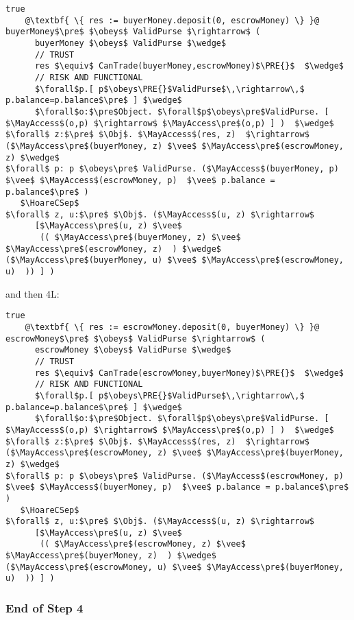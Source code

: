 \begin{lstlisting}[escapechar=@]
true
    @\textbf{ \{ res := buyerMoney.deposit(0, escrowMoney) \} }@
buyerMoney$\pre$ $\obeys$ ValidPurse $\rightarrow$ (
      buyerMoney $\obeys$ ValidPurse $\wedge$
      // TRUST
      res $\equiv$ CanTrade(buyerMoney,escrowMoney)$\PRE{}$  $\wedge$
      // RISK AND FUNCTIONAL
      $\forall$p.[ p$\obeys\PRE{}$ValidPurse$\,\rightarrow\,$ p.balance=p.balance$\pre$ ] $\wedge$
      $\forall$o:$\pre$Object. $\forall$p$\obeys\pre$ValidPurse. [ $\MayAccess$(o,p) $\rightarrow$ $\MayAccess\pre$(o,p) ] )  $\wedge$
$\forall$ z:$\pre$ $\Obj$. $\MayAccess$(res, z)  $\rightarrow$ ($\MayAccess\pre$(buyerMoney, z) $\vee$ $\MayAccess\pre$(escrowMoney, z) $\wedge$
$\forall$ p: p $\obeys\pre$ ValidPurse. ($\MayAccess$(buyerMoney, p) $\vee$ $\MayAccess$(escrowMoney, p)  $\vee$ p.balance = p.balance$\pre$ )
   $\HoareCSep$
$\forall$ z, u:$\pre$ $\Obj$. ($\MayAccess$(u, z) $\rightarrow$
      [$\MayAccess\pre$(u, z) $\vee$
       (( $\MayAccess\pre$(buyerMoney, z) $\vee$ $\MayAccess\pre$(escrowMoney, z)  ) $\wedge$ ($\MayAccess\pre$(buyerMoney, u) $\vee$ $\MayAccess\pre$(escrowMoney, u)  )) ] )
\end{lstlisting}

and then 4L:

\begin{lstlisting}[escapechar=@]
true
    @\textbf{ \{ res := escrowMoney.deposit(0, buyerMoney) \} }@
escrowMoney$\pre$ $\obeys$ ValidPurse $\rightarrow$ (
      escrowMoney $\obeys$ ValidPurse $\wedge$
      // TRUST
      res $\equiv$ CanTrade(escrowMoney,buyerMoney)$\PRE{}$  $\wedge$
      // RISK AND FUNCTIONAL
      $\forall$p.[ p$\obeys\PRE{}$ValidPurse$\,\rightarrow\,$ p.balance=p.balance$\pre$ ] $\wedge$
      $\forall$o:$\pre$Object. $\forall$p$\obeys\pre$ValidPurse. [ $\MayAccess$(o,p) $\rightarrow$ $\MayAccess\pre$(o,p) ] )  $\wedge$
$\forall$ z:$\pre$ $\Obj$. $\MayAccess$(res, z)  $\rightarrow$ ($\MayAccess\pre$(escrowMoney, z) $\vee$ $\MayAccess\pre$(buyerMoney, z) $\wedge$
$\forall$ p: p $\obeys\pre$ ValidPurse. ($\MayAccess$(escrowMoney, p) $\vee$ $\MayAccess$(buyerMoney, p)  $\vee$ p.balance = p.balance$\pre$ )
   $\HoareCSep$
$\forall$ z, u:$\pre$ $\Obj$. ($\MayAccess$(u, z) $\rightarrow$
      [$\MayAccess\pre$(u, z) $\vee$
       (( $\MayAccess\pre$(escrowMoney, z) $\vee$ $\MayAccess\pre$(buyerMoney, z)  ) $\wedge$ ($\MayAccess\pre$(escrowMoney, u) $\vee$ $\MayAccess\pre$(buyerMoney, u)  )) ] )
\end{lstlisting}

\subsubsection{End of Step 4}

